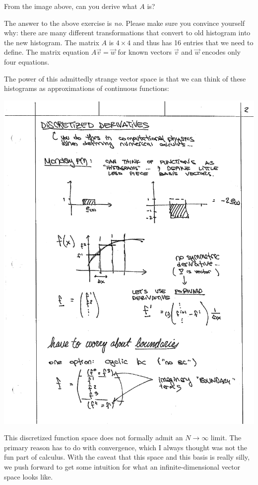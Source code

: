 \documentclass[12pt, oneside]{report}    %
\begin{document}
\begin{exercise}
From the image above, can you derive what $A$ is? 
\end{exercise}

\noindent The answer to the above exercise is \emph{no}. Please make sure you convince yourself why: there are many different transformations that convert to old histogram into the new histogram. The matrix $A$ is $4\times 4$ and thus has 16 entries that we need to define. The matrix equation $A\vec{v} = \vec{w}$ for known vectors $\vec{v}$ and $\vec{w}$ encodes only four equations.

The power of this admittedly strange vector space is that we can think of these histograms as approximations of continuous functions:

\begin{center}
\includegraphics[width=.4\textwidth]{figures/lec02_histfun.pdf}
\end{center}



This discretized function space does not formally admit an $N\to \infty$ limit. The primary reason has to do with convergence, which I always thought was not the fun part of calculus. With the caveat that this space and this basis is really silly, we push forward to get some intuition for what an infinite-dimensional vector space looks like. 
\end{document}
